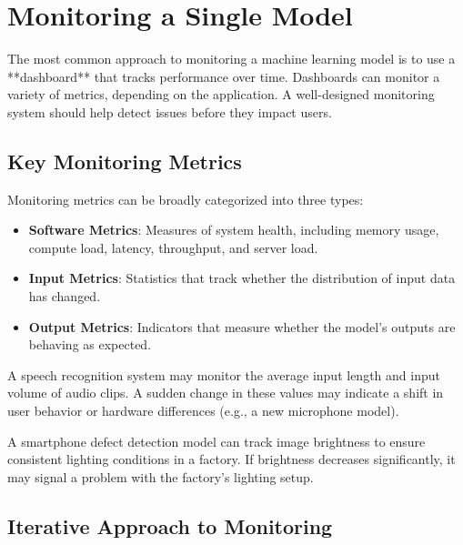 \documentclass[12pt,openany, draft]{book}
\begin{document}
\section{Monitoring a Single Model}

The most common approach to monitoring a machine learning model is to use a **dashboard** that tracks performance over time. Dashboards can monitor a variety of metrics, depending on the application. A well-designed monitoring system should help detect issues before they impact users.


\subsection{Key Monitoring Metrics}

Monitoring metrics can be broadly categorized into three types:

\begin{itemize}
    \item \textbf{Software Metrics}: Measures of system health, including memory usage, compute load, latency, throughput, and server load.
    \item \textbf{Input Metrics}: Statistics that track whether the distribution of input data has changed.
    \item \textbf{Output Metrics}: Indicators that measure whether the model's outputs are behaving as expected.
\end{itemize}

\noindent\begin{minipage}{\textwidth}
\begin{examplebox}
   A speech recognition system may monitor the average input length and input volume of audio clips. A sudden change in these values may indicate a shift in user behavior or hardware differences (e.g., a new microphone model).
\end{examplebox}
\end{minipage}

\begin{examplebox}
   A smartphone defect detection model can track image brightness to ensure consistent lighting conditions in a factory. If brightness decreases significantly, it may signal a problem with the factory's lighting setup.
\end{examplebox}


\subsection{Iterative Approach to Monitoring}
\end{document}
